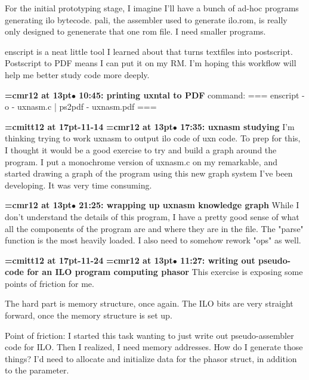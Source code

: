 For the initial prototyping stage, I imagine I'll have a bunch of ad-hoc programs generating ilo bytecode. pali, the assembler used to generate ilo.rom, is really only designed to genenerate that one rom file. I need smaller programs.
\par

enscript is a neat little tool I learned about that turns textfiles into postscript. Postscript to PDF means I can put it on my RM. I'm hoping this workflow will help me better study code more deeply.
\par

{\smallskip\noindent\bf\font\titlefont=cmr12 at 13pt\titlefont $\bullet$ 10:45: printing uxntal to PDF}\smallskip
command: === enscript -o - uxnasm.c | ps2pdf - uxnasm.pdf ===
\par

{\medskip\noindent\bf\font\titlefont=cmitt12 at 17pt-11-14}\medskip
{\smallskip\noindent\bf\font\titlefont=cmr12 at 13pt\titlefont $\bullet$ 17:35: uxnasm studying}\smallskip
I'm thinking trying to work uxnasm to output ilo code of uxn code. To prep for this, I thought it would be a good exercise to try and build a graph around the program. I put a monochrome version of uxnasm.c on my remarkable, and started drawing a graph of the program using this new graph system I've been developing. It was very time consuming.
\par

{\smallskip\noindent\bf\font\titlefont=cmr12 at 13pt\titlefont $\bullet$ 21:25: wrapping up uxnasm knowledge graph}\smallskip
While I don't understand the details of this program, I have a pretty good sense of what all the components of the program are and where they are in the file. The "parse" function is the most heavily loaded. I also need to somehow rework "ops" as well.
\par

{\medskip\noindent\bf\font\titlefont=cmitt12 at 17pt-11-24}\medskip
{\smallskip\noindent\bf\font\titlefont=cmr12 at 13pt\titlefont $\bullet$ 11:27: writing out pseudo-code for an ILO program computing phasor}\smallskip
This exercise is exposing some points of friction for me.
\par

The hard part is memory structure, once again. The ILO bits are very straight forward, once the memory structure is set up.
\par

Point of friction: I started this task wanting to just write out pseudo-assembler code for ILO. Then I realized, I need memory addresses. How do I generate those things? I'd need to allocate and initialize data for the phasor struct, in addition to the parameter.
\par

